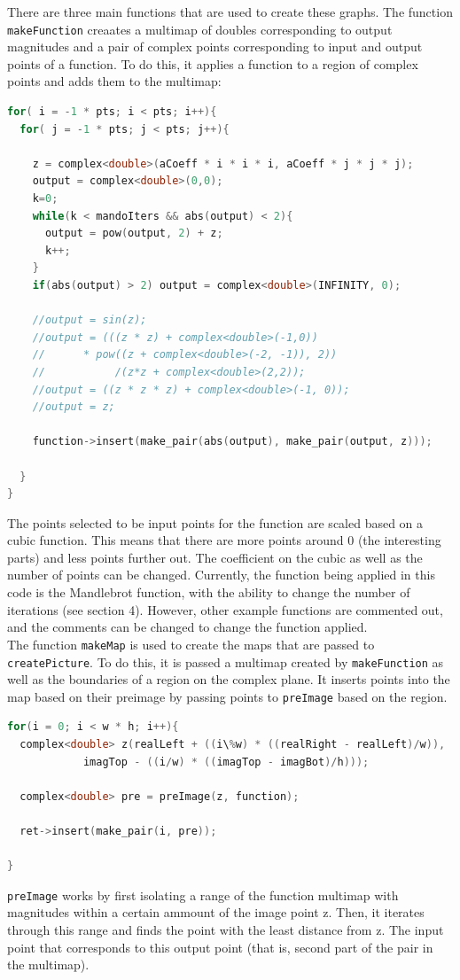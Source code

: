 \documentclass[letterpaper,12pt]{article}
\begin{document}
There are three main functions that are used to create these graphs. The function \verb|makeFunction| creaates a multimap of doubles corresponding to output magnitudes and a pair of complex points corresponding to input and output points of a function. To do this, it applies a function to a region of complex points and adds them to the multimap:
\begin{lstlisting}[language=c++]
for( i = -1 * pts; i < pts; i++){
  for( j = -1 * pts; j < pts; j++){

    z = complex<double>(aCoeff * i * i * i, aCoeff * j * j * j);
    output = complex<double>(0,0);
    k=0;
    while(k < mandoIters && abs(output) < 2){
      output = pow(output, 2) + z;
      k++;
    }
    if(abs(output) > 2) output = complex<double>(INFINITY, 0);

    //output = sin(z);
    //output = (((z * z) + complex<double>(-1,0)) 
    //		* pow((z + complex<double>(-2, -1)), 2))
    //           /(z*z + complex<double>(2,2));
    //output = ((z * z * z) + complex<double>(-1, 0));
    //output = z;

    function->insert(make_pair(abs(output), make_pair(output, z)));

  }
}
\end{lstlisting}
The points selected to be input points for the function are scaled based on a cubic function.
This means that there are more points around 0 (the interesting parts) and less points further out.
The coefficient on the cubic as well as the number of points can be changed.
Currently, the function being applied in this code is the Mandlebrot function, with the ability to change the number of iterations (see section 4).
However, other example functions are commented out, and the comments can be changed to change the function applied. \\

The function \verb|makeMap| is used to create the maps that are passed to \verb|createPicture|.
To do this, it is passed a multimap created by \verb|makeFunction| as well as the boundaries of a region on the complex plane.
It inserts points into the map based on their preimage by passing points to \verb|preImage| based on the region.
\begin{lstlisting}[language=c++]
for(i = 0; i < w * h; i++){
  complex<double> z(realLeft + ((i\%w) * ((realRight - realLeft)/w)),
			imagTop - ((i/w) * ((imagTop - imagBot)/h)));

  complex<double> pre = preImage(z, function);

  ret->insert(make_pair(i, pre));

}
\end{lstlisting}
\verb|preImage| works by first isolating a range of the function multimap with magnitudes within a certain ammount of the image point z.
Then, it iterates through this range and finds the point with the least distance from z.
The input point that corresponds to this output point (that is, second part of the pair in the multimap).
\end{document}
